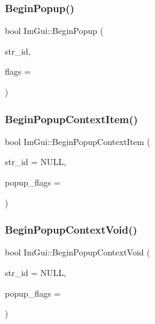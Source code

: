 \mbox{\label{namespaceImGui_a10e213926d8ca212266bc5fbded1e026}} 
\subsubsection{\texorpdfstring{Begin\+Popup()}{BeginPopup()}}
{\footnotesize\ttfamily bool Im\+Gui\+::\+Begin\+Popup (\begin{DoxyParamCaption}\item[{const char $\ast$}]{str\+\_\+id,  }\item[{Im\+Gui\+Window\+Flags}]{flags = {} }\end{DoxyParamCaption})}

\mbox{\label{namespaceImGui_a440894c8c00495d5cc01529f4504fca9}} 
\subsubsection{\texorpdfstring{Begin\+Popup\+Context\+Item()}{BeginPopupContextItem()}}
{\footnotesize\ttfamily bool Im\+Gui\+::\+Begin\+Popup\+Context\+Item (\begin{DoxyParamCaption}\item[{const char $\ast$}]{str\+\_\+id = {\ttfamily NULL},  }\item[{Im\+Gui\+Popup\+Flags}]{popup\+\_\+flags = {} }\end{DoxyParamCaption})}

\mbox{\label{namespaceImGui_a6758a456204101a9c4a660da4cfba2c9}} 
\subsubsection{\texorpdfstring{Begin\+Popup\+Context\+Void()}{BeginPopupContextVoid()}}
{\footnotesize\ttfamily bool Im\+Gui\+::\+Begin\+Popup\+Context\+Void (\begin{DoxyParamCaption}\item[{const char $\ast$}]{str\+\_\+id = {\ttfamily NULL},  }\item[{Im\+Gui\+Popup\+Flags}]{popup\+\_\+flags = {} }\end{DoxyParamCaption})}

